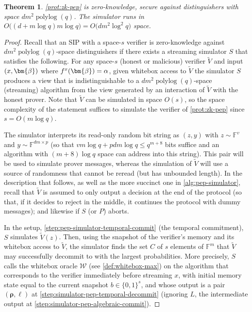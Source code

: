 \documentclass[a4paper,UKenglish,cleveref, autoref, thm-restate]{lipics-v2021}
\newtheorem{theorem}{Theorem}[section]
\theoremstyle{definition}
\newcommand{\field}{\mathbb{F}}
\newcommand{\polylog}{\operatorname{polylog}}
\newcommand{\bitset}{\{0,1\}}
\newcommand{\vcommitlength}{v}
\newcommand{\vcommitstring}{z}
\newcommand{\pcommitlength}{p}
\newcommand{\pcommitstring}{y}
\newcommand{\dimension}{m}
\newcommand{\degree}{d}
\newcommand{\fieldsize}{q}
\newcommand{\evaluationpoint}{\bm{\fe2}}
\newcommand{\fingerprinttuple}{\bm{\rho}}
\renewcommand{\line}{L}
\newcommand{\snapshot}{b}
\newcommand{\whiteboxoracle}{\mathcal{W}}
\def\fe#1{
    \ifnum#1=1
        \alpha
    \else
    \ifnum#1=2
        \beta
    \else
    \ifnum#1=3
        \gamma
    \fi\fi\fi
}
\begin{document}
\begin{theorem}
    \label{thm:pep-zk}
    \cref{prot:zk-pep} is zero-knowledge, secure against distinguishers with space $\degree\dimension^2 \polylog(\fieldsize)$. The simulator runs in $O\big((\degree + \dimension \log \fieldsize) \dimension \log \fieldsize\big) = O\big(\degree \dimension^2 \log^2 \fieldsize\big)$ space.
\end{theorem}
\begin{proof}
    Recall that an SIP with a space-$s$ verifier is zero-knowledge against $\degree\dimension^2 \polylog(\fieldsize)$-space distinguishers if there exists a streaming simulator $S$ that satisfies the following. For any space-$s$ (honest or malicious) verifier $\widetilde V$ and input $(x, \evaluationpoint)$ where $f^x(\evaluationpoint) = \fe1$, given whitebox access to $\widetilde V$ the simulator $S$ produces a view that is indistinguishable to a $\degree\dimension^2 \polylog(\fieldsize)$-space (streaming) algorithm from the view generated by an interaction of $\widetilde V$ with the honest prover. Note that $\widetilde V$ can be simulated in space $O(s)$, so the space complexity of the statement suffices to simulate the verifier of \cref{prot:zk-pep} since  $s = O(\dimension \log \fieldsize)$.

    The simulator interprets its read-only random bit string as $(\vcommitstring, \pcommitstring)$ with $\vcommitstring \sim \field^\vcommitlength$ and $\pcommitstring \sim \field^{\degree \dimension \times \pcommitlength}$ (so that $\vcommitlength \dimension \log \fieldsize + \pcommitlength \degree \dimension \log \fieldsize \leq \fieldsize^{\dimension + 8}$ bits suffice and an algorithm with $(\dimension + 8) \log \fieldsize$ space can address into this string). This pair will be used to simulate prover messages, whereas the simulation of $\widetilde V$ will use a source of randomness that cannot be reread (but has unbounded length). In the description that follows, as well as the more succinct one in \cref{alg:pep-simulator}, recall that $\widetilde V$ is assumed to only output a decision at the end of the protocol (so that, if it decides to reject in the middle, it continues the protocol with dummy messages); and likewise if $S$ (or $P$) aborts.

    In the setup, \cref{step:pep-simulator-temporal-commit} (the temporal commitment), $S$ simulates $\widetilde V(\vcommitstring)$. Then, using the snapshot of the verifier's memory and its whitebox access to $\widetilde V$, the simulator finds the set $C$ of $s$ elements of $\field^\dimension$ that $\widetilde V$ may successfully decommit to with the largest probabilities. More precisely, $S$ calls the whitebox oracle $\whiteboxoracle$ (see \cref{def:whitebox-max}) on the algorithm that corresponds to the verifier immediately before streaming $x$, with initial memory state equal to the current snapshot $\snapshot \in \bitset^s$, and whose output is a pair $(\fingerprinttuple, \ell)$ at \cref{step:simulator-pep-temporal-decommit} (ignoring $\line$, the intermediate output at \cref{step:simulator-pep-algebraic-commit}).
    

\end{proof}
\end{document}
